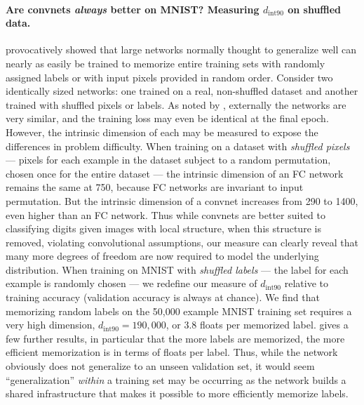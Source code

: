 \documentclass{article} %
\newcommand{\dintn}{d_{\mathrm{int90}}}
\begin{document}
\paragraph{Are convnets \emph{always} better on MNIST? Measuring $\dintn$ on shuffled data.}
\cite{zhang2016understanding} provocatively showed that large networks
normally thought to generalize well can nearly as easily be trained to
memorize entire training sets with randomly assigned labels or with
input pixels provided in random order.
% 
Consider two identically sized networks: one trained on a real, non-shuffled dataset and another
trained with shuffled pixels or labels. As noted by \cite{zhang2016understanding}, externally the networks are
very similar, and the training loss may even be identical at the final
epoch. However, the intrinsic dimension of each may be measured to
expose the differences in problem difficulty.  
%
When training on a dataset with \emph{shuffled pixels} --- pixels for each example in the dataset subject to a random permutation, chosen once for the entire dataset --- 
the intrinsic dimension of an FC
network remains the same at 750, because FC networks are invariant to input permutation. But the intrinsic
dimension of a convnet increases from 290 to 1400, even higher than
an FC network. Thus while convnets are better suited to
classifying digits given images with local structure, when
this structure is removed, violating convolutional assumptions, our measure can clearly reveal that many more
degrees of freedom are now required to model the underlying distribution.
%
When training on MNIST with \emph{shuffled labels} --- the label for each example is randomly chosen ---
we redefine our
measure of $\dintn$ relative to training accuracy (validation
accuracy is always at chance). We find that memorizing random
labels on the 50,000 example MNIST training set requires a very high dimension, $\dintn =
190,000$, or 3.8 floats per memorized
label.  gives a few further results, in
particular that the more labels are memorized, the more efficient
memorization is in terms of floats per label. Thus, while
the network obviously does not generalize to an unseen validation set,
it would seem ``generalization'' \emph{within} a training set may
be occurring as the network builds a shared infrastructure that makes
it possible to more efficiently memorize labels.

                
\end{document}
